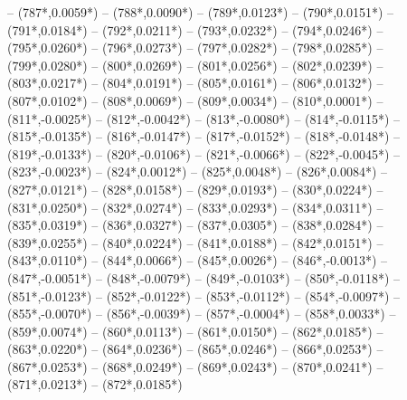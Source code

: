 {		-- ({787*\dx},{0.0059*\dy})
		-- ({788*\dx},{0.0090*\dy})
		-- ({789*\dx},{0.0123*\dy})
		-- ({790*\dx},{0.0151*\dy})
		-- ({791*\dx},{0.0184*\dy})
		-- ({792*\dx},{0.0211*\dy})
		-- ({793*\dx},{0.0232*\dy})
		-- ({794*\dx},{0.0246*\dy})
		-- ({795*\dx},{0.0260*\dy})
		-- ({796*\dx},{0.0273*\dy})
		-- ({797*\dx},{0.0282*\dy})
		-- ({798*\dx},{0.0285*\dy})
		-- ({799*\dx},{0.0280*\dy})
		-- ({800*\dx},{0.0269*\dy})
		-- ({801*\dx},{0.0256*\dy})
		-- ({802*\dx},{0.0239*\dy})
		-- ({803*\dx},{0.0217*\dy})
		-- ({804*\dx},{0.0191*\dy})
		-- ({805*\dx},{0.0161*\dy})
		-- ({806*\dx},{0.0132*\dy})
		-- ({807*\dx},{0.0102*\dy})
		-- ({808*\dx},{0.0069*\dy})
		-- ({809*\dx},{0.0034*\dy})
		-- ({810*\dx},{0.0001*\dy})
		-- ({811*\dx},{-0.0025*\dy})
		-- ({812*\dx},{-0.0042*\dy})
		-- ({813*\dx},{-0.0080*\dy})
		-- ({814*\dx},{-0.0115*\dy})
		-- ({815*\dx},{-0.0135*\dy})
		-- ({816*\dx},{-0.0147*\dy})
		-- ({817*\dx},{-0.0152*\dy})
		-- ({818*\dx},{-0.0148*\dy})
		-- ({819*\dx},{-0.0133*\dy})
		-- ({820*\dx},{-0.0106*\dy})
		-- ({821*\dx},{-0.0066*\dy})
		-- ({822*\dx},{-0.0045*\dy})
		-- ({823*\dx},{-0.0023*\dy})
		-- ({824*\dx},{0.0012*\dy})
		-- ({825*\dx},{0.0048*\dy})
		-- ({826*\dx},{0.0084*\dy})
		-- ({827*\dx},{0.0121*\dy})
		-- ({828*\dx},{0.0158*\dy})
		-- ({829*\dx},{0.0193*\dy})
		-- ({830*\dx},{0.0224*\dy})
		-- ({831*\dx},{0.0250*\dy})
		-- ({832*\dx},{0.0274*\dy})
		-- ({833*\dx},{0.0293*\dy})
		-- ({834*\dx},{0.0311*\dy})
		-- ({835*\dx},{0.0319*\dy})
		-- ({836*\dx},{0.0327*\dy})
		-- ({837*\dx},{0.0305*\dy})
		-- ({838*\dx},{0.0284*\dy})
		-- ({839*\dx},{0.0255*\dy})
		-- ({840*\dx},{0.0224*\dy})
		-- ({841*\dx},{0.0188*\dy})
		-- ({842*\dx},{0.0151*\dy})
		-- ({843*\dx},{0.0110*\dy})
		-- ({844*\dx},{0.0066*\dy})
		-- ({845*\dx},{0.0026*\dy})
		-- ({846*\dx},{-0.0013*\dy})
		-- ({847*\dx},{-0.0051*\dy})
		-- ({848*\dx},{-0.0079*\dy})
		-- ({849*\dx},{-0.0103*\dy})
		-- ({850*\dx},{-0.0118*\dy})
		-- ({851*\dx},{-0.0123*\dy})
		-- ({852*\dx},{-0.0122*\dy})
		-- ({853*\dx},{-0.0112*\dy})
		-- ({854*\dx},{-0.0097*\dy})
		-- ({855*\dx},{-0.0070*\dy})
		-- ({856*\dx},{-0.0039*\dy})
		-- ({857*\dx},{-0.0004*\dy})
		-- ({858*\dx},{0.0033*\dy})
		-- ({859*\dx},{0.0074*\dy})
		-- ({860*\dx},{0.0113*\dy})
		-- ({861*\dx},{0.0150*\dy})
		-- ({862*\dx},{0.0185*\dy})
		-- ({863*\dx},{0.0220*\dy})
		-- ({864*\dx},{0.0236*\dy})
		-- ({865*\dx},{0.0246*\dy})
		-- ({866*\dx},{0.0253*\dy})
		-- ({867*\dx},{0.0253*\dy})
		-- ({868*\dx},{0.0249*\dy})
		-- ({869*\dx},{0.0243*\dy})
		-- ({870*\dx},{0.0241*\dy})
		-- ({871*\dx},{0.0213*\dy})
		-- ({872*\dx},{0.0185*\dy})
}
